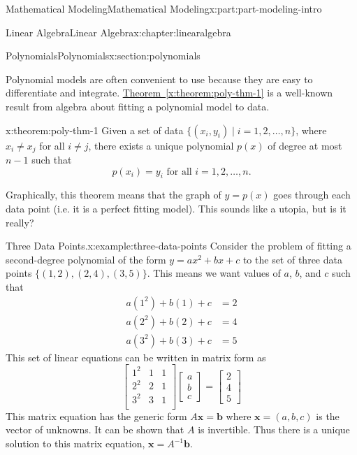 \documentclass[oneside,10pt,]{book}
\newcommand{\xreffont}{\relax}
\numberwithin{equation}{section}
\begin{document}
\begin{partptx}{Mathematical Modeling}{}{Mathematical Modeling}{}{}{x:part:part-modeling-intro}
\begin{chapterptx}{Linear Algebra}{}{Linear Algebra}{}{}{x:chapter:linearalgebra}
\begin{sectionptx}{Polynomials}{}{Polynomials}{}{}{x:section:polynomials}
\begin{introduction}{}
Polynomial models are often convenient to use because they are easy to differentiate and integrate. \hyperref[x:theorem:poly-thm-1]{Theorem~{\xreffont\ref{x:theorem:poly-thm-1}}} is a well-known result from algebra about fitting a polynomial model to data.%
\begin{theorem}{}{}{x:theorem:poly-thm-1}%
Given a set of data \(\{(x_i, y_i)\mid i=1, 2, \dots, n\}\), where \(x_i\ne x_j\) for all \(i\ne j\), there exists a unique polynomial \(p(x)\) of degree at most \(n-1\) such that%
%
\begin{equation*}
p(x_i) = y_i \text{ for all } i=1, 2, \dots, n.
\end{equation*}
\end{theorem}
Graphically, this theorem means that the graph of \(y = p (x)\) goes through each data point (i.e. it is a perfect fitting model). This sounds like a utopia, but is it really?%
\end{introduction}%
\begin{example}{Three Data Points.}{x:example:three-data-points}%
Consider the problem of fitting a second-degree polynomial of the form \(y = ax^2 +bx+c\) to the set of three data points \(\{(1, 2), (2, 4), (3, 5)\}\). This means we want values of \(a\), \(b\), and \(c\) such that%
%
\begin{equation*}
\begin{aligned}
a(1^2) + b(1) + c & = 2 \\
a(2^2) + b(2) + c & = 4 \\
a(3^2) + b(3) + c & = 5
\end{aligned}
\end{equation*}
This set of linear equations can be written in matrix form as%
%
\begin{equation*}
\begin{bmatrix}
1^2 & 1 & 1 \\
2^2 & 2 & 1 \\
3^2 & 3 & 1 \\
\end{bmatrix}
\begin{bmatrix}
a \\
b \\
c
\end{bmatrix} = \begin{bmatrix}
2 \\
4 \\
5
\end{bmatrix}
\end{equation*}
This matrix equation has the generic form \(A\mathbf{x} = \mathbf{b}\) where \(\mathbf{x} = (a, b, c)\) is the vector of unknowns. It can be shown that \(A\) is invertible. Thus there is a unique solution to this matrix equation, \(\mathbf{x} = A^{-1}\mathbf{b}\).%

\end{example}
\end{sectionptx}
\end{chapterptx}
\end{partptx}
\end{document}
